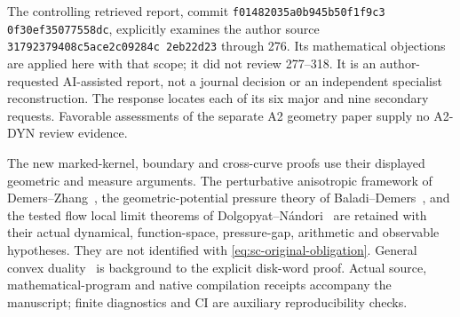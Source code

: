 \documentclass[11pt,reqno]{amsart}
\numberwithin{equation}{section}
\theoremstyle{definition}\newtheorem{definition}[theorem]{Definition}
\theoremstyle{remark}\newtheorem{remark}[theorem]{Remark}
\begin{document}
The controlling retrieved report, commit
\texttt{f0148203\allowbreak 5a0b945b\allowbreak 50f1f9c3\allowbreak
0f30ef35\allowbreak 077558dc},
explicitly examines the author source
\texttt{31792379\allowbreak 408c5ace\allowbreak 2c09284c\allowbreak
2eb22d23}
through 276.  Its mathematical objections are applied here with
that scope; it did not review 277--318.  It is an author-requested
AI-assisted report, not a journal decision or an independent
specialist reconstruction.  The response locates each of its six
major and nine secondary requests.  Favorable assessments of the
separate A2 geometry paper supply no A2-DYN review evidence.

The new marked-kernel, boundary and cross-curve proofs use their displayed
geometric and measure arguments.  The perturbative anisotropic
framework of Demers--Zhang~\cite{DZUniform}, the
geometric-potential pressure theory of
Baladi--Demers~\cite{BDPressure}, and the tested flow local limit
theorems of Dolgopyat--N\'andori~\cite{DNFlow} are retained with
their actual dynamical, function-space, pressure-gap, arithmetic
and observable hypotheses.  They are not identified with
\eqref{eq:sc-original-obligation}.  General convex
duality~\cite{BVNotes} is background to the explicit disk-word
proof.  Actual source, mathematical-program and native compilation
receipts accompany the manuscript; finite diagnostics and CI are
auxiliary reproducibility checks.
\end{document}

